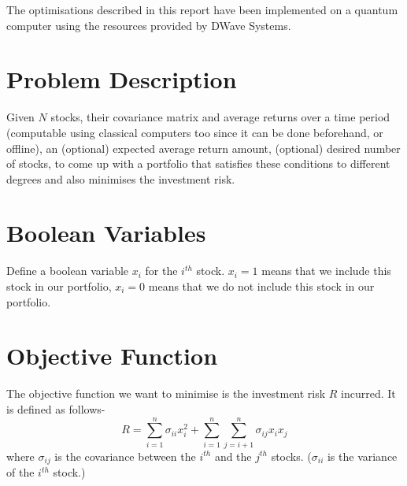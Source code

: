 \documentclass[a4paper]{report}
\begin{document}
The optimisations described in this report have been implemented on a quantum computer using the resources provided by DWave Systems.

\section{Problem Description}
Given $N$ stocks, their covariance matrix and average returns over a time period (computable using classical computers too since it can be done beforehand, or offline),
an (optional) expected average return amount, (optional) desired number of stocks, to come up with a portfolio that satisfies
these conditions to different degrees and also minimises the investment risk.

\section{Boolean Variables}
Define a boolean variable $x_i$ for the $i^{th}$ stock. $x_i = 1$ means that we include this stock in our portfolio, 
$x_i = 0$ means that we do not include this stock in our portfolio.

\section{Objective Function}
The objective function we want to minimise is the investment risk $R$ incurred. It is defined as follows-
$$ R = \sum\limits_{i = 1}^{n}\sigma_{ii}x_i^2 + \sum\limits_{i = 1}^{n}\sum\limits_{j = i + 1}^{n}\sigma_{ij}x_ix_j$$
where $\sigma_{ij}$ is the covariance between the $i^{th}$ and the $j^{th}$ stocks. ($\sigma_{ii}$ is the variance of
the $i^{th}$ stock.)
\end{document}
